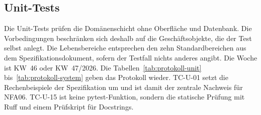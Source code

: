 \subsection{Unit-Tests}\label{sec:protokoll-unit}
Die Unit-Tests prüfen die Domänenschicht ohne Oberfläche und Datenbank. Die Vorbedingungen beschränken sich deshalb auf die Geschäftsobjekte, die der Test selbst anlegt. Die Lebensbereiche entsprechen den zehn Standardbereichen aus dem Spezifikationsdokument, sofern der Testfall nichts anderes angibt. Die Woche ist KW~46 oder KW~47/2026. Die Tabellen~\ref{tab:protokoll-unit} bis~\ref{tab:protokoll-system} geben das Protokoll wieder. TC-U-01 setzt die Rechenbeispiele der Spezifikation um und ist damit der zentrale Nachweis für NFA06. TC-U-15 ist keine pytest-Funktion, sondern die statische Prüfung mit Ruff und einem Prüfskript für Docstrings.

